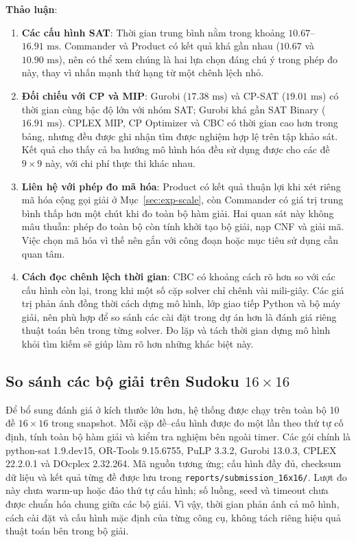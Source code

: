\documentclass[a4paper,fleqn,nologo]{cas-sc}
\begin{document}
\textbf{Thảo luận}:
\begin{enumerate}
    \item \textbf{Các cấu hình SAT}: Thời gian trung bình nằm trong khoảng $10.67$--$16.91\text{ ms}$. Commander và Product có kết quả khá gần nhau ($10.67$ và $10.90\text{ ms}$), nên có thể xem chúng là hai lựa chọn đáng chú ý trong phép đo này, thay vì nhấn mạnh thứ hạng từ một chênh lệch nhỏ.
    \item \textbf{Đối chiếu với CP và MIP}: Gurobi ($17.38\text{ ms}$) và CP-SAT ($19.01\text{ ms}$) có thời gian cùng bậc độ lớn với nhóm SAT; Gurobi khá gần SAT Binary ($16.91\text{ ms}$). CPLEX MIP, CP Optimizer và CBC có thời gian cao hơn trong bảng, nhưng đều được ghi nhận tìm được nghiệm hợp lệ trên tập khảo sát. Kết quả cho thấy cả ba hướng mô hình hóa đều sử dụng được cho các đề $9\times9$ này, với chi phí thực thi khác nhau.
    \item \textbf{Liên hệ với phép đo mã hóa}: Product có kết quả thuận lợi khi xét riêng mã hóa cộng gọi giải ở Mục~\ref{sec:exp-scale}, còn Commander có giá trị trung bình thấp hơn một chút khi đo toàn bộ hàm giải. Hai quan sát này không mâu thuẫn: phép đo toàn bộ còn tính khởi tạo bộ giải, nạp CNF và giải mã. Việc chọn mã hóa vì thế nên gắn với công đoạn hoặc mục tiêu sử dụng cần quan tâm.
    \item \textbf{Cách đọc chênh lệch thời gian}: CBC có khoảng cách rõ hơn so với các cấu hình còn lại, trong khi một số cặp solver chỉ chênh vài mili-giây. Các giá trị phản ánh đồng thời cách dựng mô hình, lớp giao tiếp Python và bộ máy giải, nên phù hợp để so sánh các cài đặt trong dự án hơn là đánh giá riêng thuật toán bên trong từng solver. Đo lặp và tách thời gian dựng mô hình khỏi tìm kiếm sẽ giúp làm rõ hơn những khác biệt này.
\end{enumerate}

\subsection{So sánh các bộ giải trên Sudoku $16\times16$}
\label{sec:large-solvers}
Để bổ sung đánh giá ở kích thước lớn hơn, hệ thống được chạy trên toàn bộ 10 đề $16\times16$ trong snapshot. Mỗi cặp đề--cấu hình được đo một lần theo thứ tự cố định, tính toàn bộ hàm giải và kiểm tra nghiệm bên ngoài timer. Các gói chính là python-sat 1.9.dev15, OR-Tools 9.15.6755, PuLP 3.3.2, Gurobi 13.0.3, CPLEX 22.2.0.1 và DOcplex 2.32.264. Mã nguồn tương ứng; cấu hình đầy đủ, checksum dữ liệu và kết quả từng đề được lưu trong \texttt{reports/submission\_16x16/}.
Lượt đo này chưa warm-up hoặc đảo thứ tự cấu hình; số luồng, seed và timeout chưa được chuẩn hóa chung giữa các bộ giải. Vì vậy, thời gian phản ánh cả mô hình, cách cài đặt và cấu hình mặc định của từng công cụ, không tách riêng hiệu quả thuật toán bên trong bộ giải.
\end{document}
